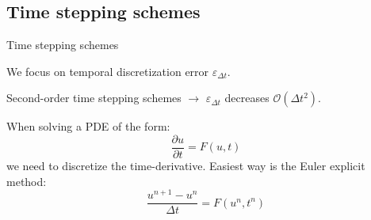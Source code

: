 \documentclass[
  english,            %
  aspectratio=43,    %
]{tumbeamer}
\begin{document}
\subsection{Time stepping schemes}
\begin{frame}{Time stepping schemes}
\vspace{10pt}

We focus on temporal discretization error $\varepsilon_{\Delta t}$.
\vspace{10pt}

Second-order time stepping schemes $\rightarrow$ $\varepsilon_{\Delta t}$ decreases $\mathcal{O}(\Delta t^2)$. \\
\vspace{10pt}

\pause
When solving a PDE of the form:
\begin{equation}
    \frac{\partial u}{\partial t} = F(u, t)
\end{equation}
we need to discretize the time-derivative. Easiest way is the Euler explicit method: \\
\begin{equation}
    \frac{u^{n+1} - u^n}{\Delta t} = {F}(u^{n}, t^{n})
\end{equation}
\end{frame}
\end{document}
